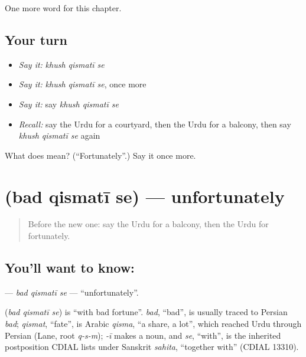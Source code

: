 \begin{grammarlens}[title={What you've built}]
One more word for this chapter.
\end{grammarlens}

\subsection*{Your turn}
\begin{itemize}
\raggedright
  \item \emph{Say it:} \emph{khush qismatī se}
  \item \emph{Say it:} \emph{khush qismatī se}, once more
  \item \emph{Say it:} say \emph{khush qismatī se}
  \item \emph{Recall:} say the Urdu for a courtyard, then the Urdu for a balcony, then say \emph{khush qismatī se} again
\end{itemize}

\begin{tcolorbox}[breakable,colback=teal!4,colframe=teal!35!black,title={Before you move on}]
What does    mean? (\textquotedblleft{}Fortunately\textquotedblright{}.) Say it once more.
\end{tcolorbox}
\section[\texorpdfstring{\ur{بد} \ur{قسمتی} \ur{سے} (bad qismatī se)}{بد قسمتی سے (bad qismatī se)}]{   (bad qismatī se) — unfortunately}

\label{lesson:UR-C220-bad-qismati-se}



\begin{quote}
Before the new one: say the Urdu for a balcony, then the Urdu for fortunately.
\end{quote}

\subsection*{You'll want to know:   }
\textbf{  } — \emph{bad qismatī se} — \textquotedblleft{}unfortunately\textquotedblright{}.

\begin{cousinweb}
\textbf{  } (\emph{bad qismatī se}) is \textquotedblleft{}with bad fortune\textquotedblright{}. \emph{bad}, \textquotedblleft{}bad\textquotedblright{}, is usually traced to Persian \emph{bad}; \emph{qismat}, \textquotedblleft{}fate\textquotedblright{}, is Arabic \emph{qisma}, \textquotedblleft{}a share, a lot\textquotedblright{}, which reached Urdu through Persian (Lane, root \emph{q-s-m}); \emph{-ī} makes a noun, and \emph{se}, \textquotedblleft{}with\textquotedblright{}, is the inherited postposition CDIAL lists under Sanskrit \emph{sahita}, \textquotedblleft{}together with\textquotedblright{} (CDIAL 13310).
\end{cousinweb}

